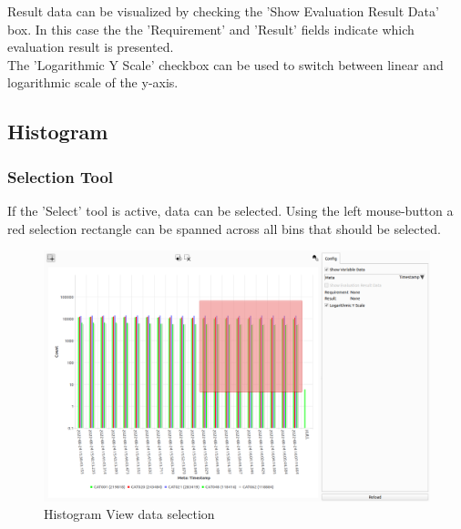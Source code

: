 Result data can be visualized by checking the 'Show Evaluation Result Data' box. 
In this case the the 'Requirement' and 'Result' fields indicate which evaluation result is presented. \\

The 'Logarithmic Y Scale' checkbox can be used to switch between linear and logarithmic scale of the y-axis. \\

\subsection{Histogram}



\subsubsection{Selection Tool}

If the 'Select' tool is active, data can be selected. Using the left mouse-button a red selection rectangle can be spanned across all bins that should be selected.

\begin{figure}[H]
    \hspace*{-2cm}
    \includegraphics[width=18cm,frame]{figures/histogram_select.png}
  \caption{Histogram View data selection}
\end{figure}

